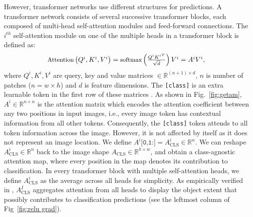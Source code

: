 \documentclass[10pt,twocolumn,letterpaper]{article}
\begin{document}
However, transformer networks use different structures for predictions. 
A transformer network consists of several successive transformer blocks, each composed of multi-head self-attention modules and feed-forward connections.
The $i^{th}$ self-attention module on one of the multiple heads in a transformer block is defined as:
\begin{equation}
\label{equation qkv}
\small
\textstyle{
\text{Attention}\left(Q^i,K^i,V^i\right) = \text{softmax}\left(\frac{Q^i {K^i}^{T}}{\sqrt{d}}\right) V^i
 = A^i V^i,}
\end{equation}
\noindent
where $Q^i,K^i,V^i$ are query, key and value matrices $\in \mathbb{R}^{(n+1)\times d}$, $n$ is number of patches ($n = w\times h$) and $d$ is feature dimensions.
The \texttt{[class]} is an extra learnable token in the first row of these matrices \cite{dosovitskiy2020image}.
As shown in Fig.~\ref{fig:getam}, $A^i\in \mathbb{R}^{n\times n}$ is the attention matrix which encodes the attention coefficient between any two positions in input images, i.e., every image token has contextual information from all other tokens.
Consequently, 
the \texttt{[class]} token attends to all token information across the image. However, it is not affected by itself as it does not represent an image location.
We define $A^i\texttt{[0,1:]} = A_{\text{CLS}}^{i} \in \mathbb{R}^{n} $.
We can reshape $A_{\text{CLS}}^{i} \in \mathbb{R}^{n}$ back to the image shape $A_{\text{CLS}} \in \mathbb{R}^{h\times w}$, and obtain a class-agnostic attention map, where every position in the map denotes its contribution to classification.
In every transformer block with multiple self-attention heads, we define $A_{\text{CLS}}^i$ as the average across all heads for simplicity. 
As empirically verified in \cite{gao2021tscam}, $A^I_{\text{CLS}}$
aggregates attention from all heads to display the object extent that possibly contributes to classification predictions (see the leftmost column
of Fig~\ref{fig:relu grad}). 
\end{document}
